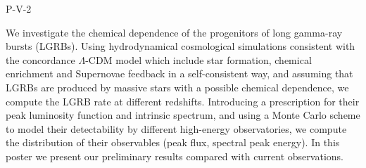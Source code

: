 P-V-2


\bigskip



\bigskip

\noindent We investigate the chemical dependence of the progenitors of long gamma-ray bursts (LGRBs). Using hydrodynamical cosmological simulations consistent with the concordance $\Lambda$-CDM model which include star formation, chemical enrichment and Supernovae feedback in a self-consistent way, and assuming that LGRBs are produced by massive stars with a possible chemical dependence, we compute the LGRB rate at different redshifts. Introducing a prescription for their peak luminosity function and intrinsic spectrum, and using a Monte Carlo scheme to model their detectability by different high-energy observatories, we compute the distribution of their observables (peak flux, spectral peak energy). In this poster we present our preliminary results compared with current observations.

